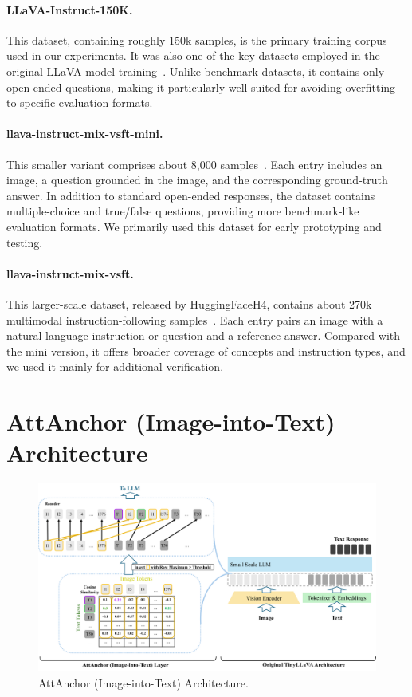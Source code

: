 \documentclass[11pt]{article}
\begin{document}
\paragraph{LLaVA-Instruct-150K.} 
This dataset, containing roughly 150k samples, is the primary training corpus used in our experiments. It was also one of the key datasets employed in the original LLaVA model training~\citep{liu2023llava}. Unlike benchmark datasets, it contains only open-ended questions, making it particularly well-suited for avoiding overfitting to specific evaluation formats. 

\paragraph{llava-instruct-mix-vsft-mini.} 
This smaller variant comprises about 8{,}000 samples~\citep{unsloth_llava_instruct_mix_vsft_mini}. Each entry includes an image, a question grounded in the image, and the corresponding ground-truth answer. In addition to standard open-ended responses, the dataset contains multiple-choice and true/false questions, providing more benchmark-like evaluation formats. We primarily used this dataset for early prototyping and testing.  

\paragraph{llava-instruct-mix-vsft.} 
This larger-scale dataset, released by HuggingFaceH4, contains about 270k multimodal instruction-following samples~\citep{huggingfaceh4_llava_instruct_mix_vsft}. Each entry pairs an image with a natural language instruction or question and a reference answer. Compared with the mini version, it offers broader coverage of concepts and instruction types, and we used it mainly for additional verification.



\section{AttAnchor (Image-into-Text) Architecture}
\label{app:image_into_text_arch}

\begin{figure}[H]
    \centering    \includegraphics[width=1.0\linewidth]{iclr2026/Attanchor_I2T_arch.png}
    \caption{AttAnchor (Image-into-Text) Architecture.}
    \label{fig:coser}
\end{figure}
\end{document}
